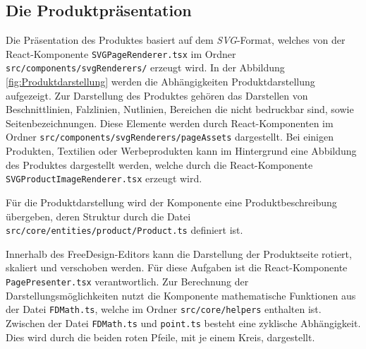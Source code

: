 \subsection{Die Produktpräsentation}
Die Präsentation des Produktes basiert auf dem \emph{SVG}-Format, welches von der React-Komponente \lstinline|SVGPageRenderer.tsx| im Ordner \lstinline|src/components/svgRenderers/| erzeugt wird. 
In der Abbildung \ref{fig:Produktdarstellung} werden die Abhängigkeiten Produktdarstellung aufgezeigt. 
Zur Darstellung des Produktes gehören das Darstellen von Beschnittlinien, Falzlinien, Nutlinien, Bereichen die nicht bedruckbar sind, sowie Seitenbezeichnungen. 
Diese Elemente werden durch React-Komponenten im Ordner \lstinline|src/components/svgRenderers/pageAssets| dargestellt.
Bei einigen Produkten, Textilien oder Werbeprodukten kann im Hintergrund eine Abbildung des Produktes dargestellt werden, welche durch die React-Komponente \lstinline|SVGProductImageRenderer.tsx| erzeugt wird. 

Für die Produktdarstellung wird der Komponente eine Produktbeschreibung übergeben, deren Struktur durch die Datei \lstinline|src/core/entities/product/Product.ts| definiert ist.

Innerhalb des FreeDesign-Editors kann die Darstellung der Produktseite rotiert, skaliert und verschoben werden. Für diese Aufgaben ist die React-Komponente \lstinline|PagePresenter.tsx| verantwortlich. 
Zur Berechnung der Darstellungsmöglichkeiten nutzt die Komponente mathematische Funktionen aus der Datei \lstinline|FDMath.ts|, welche im Ordner \lstinline|src/core/helpers| enthalten ist. 
Zwischen der Datei \lstinline|FDMath.ts| und \lstinline|point.ts| besteht eine zyklische Abhängigkeit. Dies wird durch die beiden roten Pfeile, mit je einem Kreis, dargestellt.

% 



